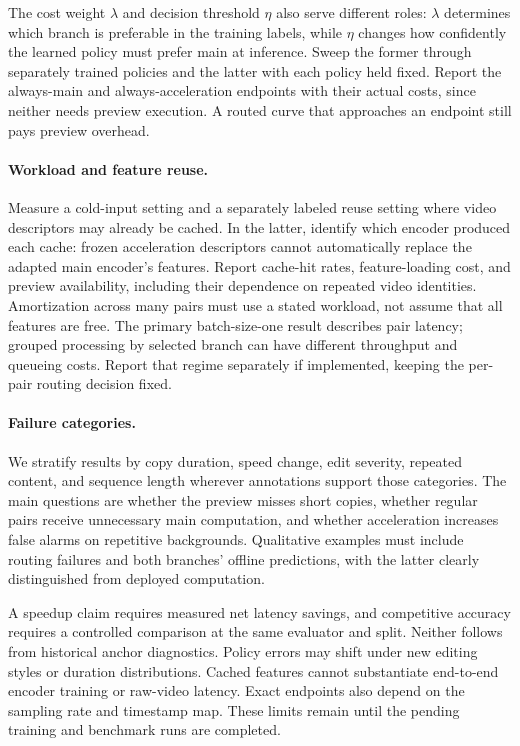 The cost weight $\lambda$ and decision threshold $\eta$ also serve different roles:
$\lambda$ determines which branch is preferable in the training labels, while $\eta$
changes how confidently the learned policy must prefer main at inference. Sweep the former
through separately trained policies and the latter with each policy held fixed. Report the
always-main and always-acceleration endpoints with their actual costs, since neither needs
preview execution. A routed curve that approaches an endpoint still pays preview overhead.

\paragraph{Workload and feature reuse.}
Measure a cold-input setting and a separately labeled reuse setting where video descriptors
may already be cached. In the latter, identify which encoder produced each cache: frozen
acceleration descriptors cannot automatically replace the adapted main encoder's features.
Report cache-hit rates, feature-loading cost, and preview availability, including their
dependence on repeated video identities. Amortization across many pairs must use a stated
workload, not assume that all features are free. The primary batch-size-one result describes
pair latency; grouped processing by selected branch can have different throughput and
queueing costs. Report that regime separately if implemented, keeping the per-pair routing
decision fixed.

\paragraph{Failure categories.}
We stratify results by copy duration, speed change, edit severity, repeated content, and
sequence length wherever annotations support those categories. The main questions are whether
the preview misses short copies, whether regular pairs receive unnecessary main computation,
and whether acceleration increases false alarms on repetitive backgrounds. Qualitative
examples must include routing failures and both branches' offline predictions, with the
latter clearly distinguished from deployed computation.

A speedup claim requires measured net latency savings, and competitive accuracy requires a
controlled comparison at the same evaluator and split. Neither follows from historical
anchor diagnostics. Policy errors may shift under new editing styles or duration distributions.
Cached features cannot substantiate end-to-end encoder training or raw-video latency.
Exact endpoints also depend on the sampling rate and timestamp map. These limits remain
until the pending training and benchmark runs are completed.

